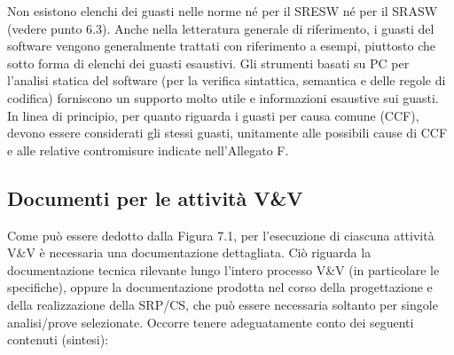 Non esistono elenchi dei guasti nelle norme né per il SRESW né per il SRASW (vedere punto 6.3). Anche nella letteratura generale di riferimento, i guasti del software vengono generalmente trattati con riferimento a esempi, piuttosto che sotto forma di elenchi dei guasti esaustivi. Gli strumenti basati su PC per l'analisi statica del software (per la verifica sintattica, semantica e delle regole di codifica) forniscono un supporto molto utile e informazioni esaustive sui guasti.
In linea di principio, per quanto riguarda i guasti per causa comune (CCF), devono essere considerati gli stessi guasti, unitamente alle possibili cause di CCF e alle relative contromisure indicate nell'Allegato F.

\subsection{Documenti per le attività V\&V}
\label{subsec:07-1-4}
Come può essere dedotto dalla Figura 7.1, per l'esecuzione di ciascuna attività V\&V è necessaria una documentazione dettagliata. Ciò riguarda la documentazione tecnica rilevante lungo l'intero processo V\&V (in particolare le specifiche), oppure la documentazione prodotta nel corso della progettazione e della realizzazione della SRP/CS, che può essere necessaria soltanto per singole analisi/prove selezionate. Occorre tenere adeguatamente conto dei seguenti contenuti (sintesi):
